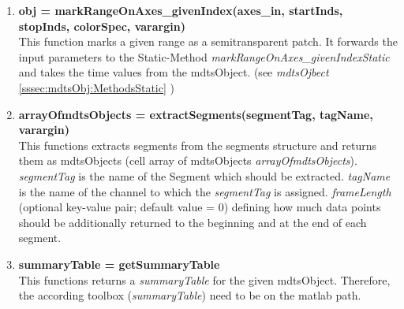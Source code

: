 \documentclass[a4]{scrreprt}
\begin{document}
\begin{enumerate}
\item \textbf{obj = markRangeOnAxes\_givenIndex(axes\_in, startInds, stopInds, colorSpec, varargin)}\\
This function marks a given range as a semitransparent patch. It forwards the input parameters to the Static-Method \textit{markRangeOnAxes\_givenIndexStatic} and takes the time values from the mdtsObject.
(see \textit{mdtsOjbect} \ref{sssec:mdtsObj:MethodsStatic} )

\item \textbf{arrayOfmdtsObjects = extractSegments(segmentTag, tagName, varargin)}\\
This functions extracts segments from the segments  structure and returns them as mdtsObjects (cell array of mdtsObjects \textit{arrayOfmdtsObjects}). \textit{segmentTag} is the name of the Segment which should be extracted. \textit{tagName} is the name of the channel to which the \textit{segmentTag} is assigned. \textit{frameLength} (optional key-value pair; default value = 0) defining how much data points should be additionally returned to the beginning and at the end of each segment.




\item \textbf{summaryTable = getSummaryTable}\\
This functions returns a \textit{summaryTable} for the given mdtsObject. Therefore, the according toolbox (\textit{summaryTable}) need to be on the matlab path.


\end{enumerate}
\end{document}
